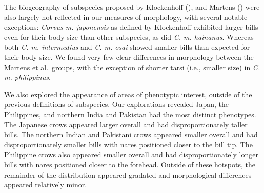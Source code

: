 \documentclass[10pt,a4paper]{article}
\begin{document}
The biogeography of subspecies proposed by Klockenhoff (), and Martens () were also largely not reflected in our measures of morphology, with several notable exceptions: \emph{Corvus m. japonensis} as defined by Klockenhoff exhibited larger bills even for their body size than other subspecies, as did \emph{C. m. hainanus}.
Whereas both \emph{C. m. intermedius} and \emph{C. m. osai} showed smaller bills than expected for their body size.
We found very few clear differences in morphology between the Martens et al.~groups, with the exception of shorter tarsi (i.e., smaller size) in \emph{C. m. philippinus}.

We also explored the appearance of areas of phenotypic interest, outside of the previous definitions of subspecies.
Our explorations revealed Japan, the Philippines, and northern India and Pakistan had the most distinct phenotypes.
The Japanese crows appeared larger overall and had disproportionately taller bills.
The northern Indian and Pakistani crows appeared smaller overall and had disproportionately smaller bills with nares positioned closer to the bill tip.
The Philippine crows also appeared smaller overall and had disproportionately longer bills with nares positioned closer to the forehead.
Outside of these hotspots, the remainder of the distribution appeared gradated and morphological differences appeared relatively minor.
\end{document}
